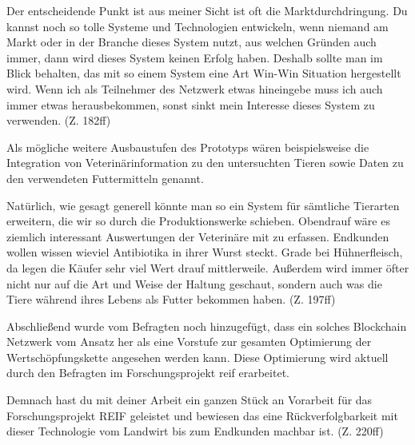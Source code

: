 \begin{displayquote}
    \glqq Der entscheidende Punkt ist aus meiner Sicht ist oft die Marktdurchdringung. Du kannst noch so tolle Systeme und Technologien entwickeln, wenn niemand am Markt oder in der Branche dieses System nutzt, aus welchen Gründen auch immer, dann wird dieses System keinen Erfolg haben. Deshalb sollte man im Blick behalten, das mit so einem System eine Art \glqq Win-Win\grqq{} Situation hergestellt wird. Wenn ich als Teilnehmer des Netzwerk etwas hineingebe muss ich auch immer etwas herausbekommen, sonst sinkt mein Interesse dieses System zu verwenden.\grqq{} (Z. 182ff)
\end{displayquote}

Als mögliche weitere Ausbaustufen des Prototyps wären beispielsweise die Integration von Veterinärinformation zu den untersuchten Tieren sowie Daten zu den verwendeten Futtermitteln genannt.

\begin{displayquote}
    \glqq Natürlich, wie gesagt generell könnte man so ein System für sämtliche Tierarten erweitern, die wir so durch die Produktionswerke schieben. Obendrauf wäre es ziemlich interessant Auswertungen der Veterinäre mit zu erfassen. Endkunden wollen wissen wieviel Antibiotika in ihrer Wurst steckt. Grade bei Hühnerfleisch, da legen die Käufer sehr viel Wert drauf mittlerweile. Außerdem wird immer öfter nicht nur auf die Art und Weise der Haltung geschaut, sondern auch was die Tiere während ihres Lebens als Futter bekommen haben.\grqq{} (Z. 197ff)
\end{displayquote}

Abschließend wurde vom Befragten noch hinzugefügt, dass ein solches Blockchain Netzwerk vom Ansatz her als eine Vorstufe zur gesamten Optimierung der Wertschöpfungskette angesehen werden kann. Diese Optimierung wird aktuell durch den Befragten im Forschungsprojekt \ac{reif} erarbeitet.

\begin{displayquote}
    \glqq Demnach hast du mit deiner Arbeit ein ganzen Stück an Vorarbeit für das Forschungsprojekt REIF geleistet und bewiesen das eine Rückverfolgbarkeit mit dieser Technologie vom Landwirt bis zum Endkunden machbar ist.\grqq{} (Z. 220ff)
\end{displayquote}

\newpage
